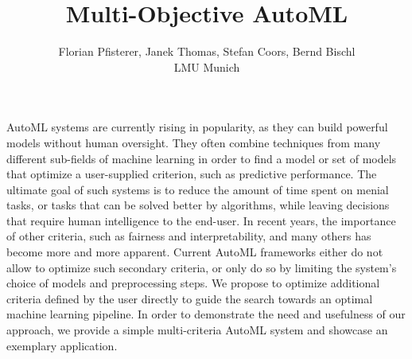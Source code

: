\documentclass[portrait, 25pt, a0paper, blockverticalspace=0.6cm, innermargin=0.6cm, colspace=0.5cm]{tikzposter}\usepackage[]{graphicx}\usepackage[]{color}
\title{Multi-Objective AutoML}
\author{
Florian Pfisterer, Janek Thomas, Stefan Coors, Bernd Bischl \\
LMU Munich
}
\begin{document}
\maketitle[width = 0.8\textwidth]


{
AutoML systems are currently rising in popularity, as they can build powerful models without human oversight.
They often combine techniques from many different sub-fields of machine learning in order to find a model or set of models that optimize a user-supplied criterion, such as predictive performance. The ultimate goal of such systems is to reduce the amount of time spent on menial tasks, or tasks that can be solved better by algorithms, while leaving decisions that require human intelligence to the end-user. In recent years, the importance of other criteria, such as fairness and interpretability, and many others has become more and more apparent. Current AutoML frameworks either do not allow to optimize such secondary criteria, or only do so by limiting the system's choice of models and preprocessing steps. We propose to optimize additional criteria defined by the user directly to guide the search towards an optimal machine learning pipeline. In order to demonstrate the need and usefulness of our approach, we provide a simple multi-criteria AutoML system and showcase an exemplary application.
}
\end{document}
